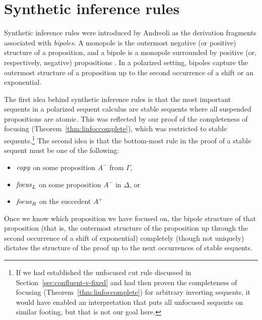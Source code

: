 \section{Synthetic inference rules}
\label{sec:linsynthetic}

Synthetic inference rules were introduced by Andreoli as the
derivation fragments associated with {\it
  bipoles}. A monopole is the outermost negative (or positive)
structure of a proposition, and a bipole is a monopole surrounded by
positive (or, respectively, negative) propositions
\cite{andreoli01focussing}. In a polarized setting, bipoles capture
the outermost structure of a proposition up to the second occurrence
of a shift or an exponential.

The first idea behind synthetic inference rules is that the most
important sequents in a polarized sequent calculus are stable sequents
where all suspended propositions are atomic.  This was reflected by
our proof of the completeness of focusing
(Theorem~\ref{thm:linfoccomplete}), which was restricted to stable
sequents.\footnote{If we had established the unfocused cut rule
  discussed in Section~\ref{sec:confluent-v-fixed} and had then proven
  the completeness of focusing (Theorem~\ref{thm:linfoccomplete}) for
  arbitrary inverting sequents, it would have enabled an
  interpretation that puts all unfocused sequents on similar footing,
  but that is not our goal here.}
The second idea is that the bottom-most rule in the proof of 
a stable sequent must be one of the following:
\smallskip
\begin{itemize}
\item ${\it copy}$ on some proposition $A^-$ from $\Gamma$, 
\item ${\it focus}_L$ on some proposition $A^-$ in $\Delta$, or
\item ${\it focus}_R$ on the succedent $A^+$
\end{itemize}
\smallskip
%
Once we know which proposition we have focused on, the bipole
structure of that proposition (that is, the outermost structure of the
proposition up through the second occurrence of a shift of exponential)
completely (though not uniquely) dictates the structure of the proof
up to the next occurrences of stable sequents.

